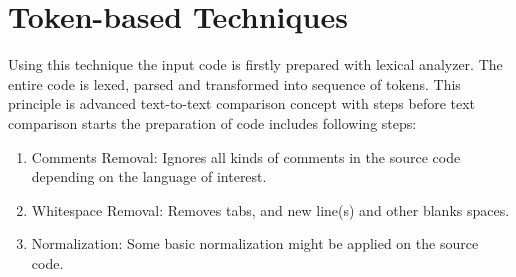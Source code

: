 \documentclass{report}
\begin{document}
\section{Token-based Techniques}
\label{sec: tocken_tech}

Using this technique the input code is firstly prepared with lexical analyzer. The entire code is lexed, parsed and transformed into sequence of tokens. This principle is advanced text-to-text comparison concept with steps before text comparison starts the preparation of code includes following steps:
\begin{enumerate}
  \item Comments Removal: Ignores all kinds of comments in the source code depending on the language of interest.
  \item Whitespace Removal: Removes tabs, and new line(s) and other blanks spaces.
  \item Normalization: Some basic normalization might be applied on the source code.
\end{enumerate}
\end{document}
